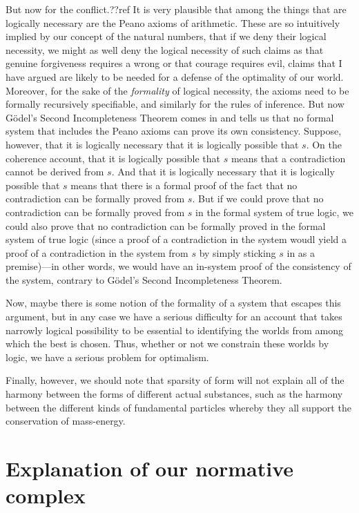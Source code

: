 But now for the conflict.??ref It is very plausible that among the things that are logically necessary are the Peano axioms of 
arithmetic. These are so intuitively implied by our concept of the natural numbers, that if we deny their logical necessity,
we might as well deny the logical necessity of such claims as that genuine forgiveness requires a wrong or that courage 
requires evil, claims that I have argued are likely to be needed for a defense of the optimality of our world. Moreover, for
the sake of the \textit{formality} of logical necessity, the axioms need to be formally recursively specifiable, and similarly
for the rules of inference. But now G\"odel's Second Incompleteness Theorem comes in and tells us that no formal system 
that includes the Peano axioms can prove its own consistency. Suppose, however, that it is logically necessary that it is 
logically possible that $s$. On the coherence account, that it is logically possible that $s$ means that a contradiction
cannot be derived from $s$. And that it is logically necessary that it is logically possible that $s$ means that there is 
a formal proof of the fact that no contradiction can be formally proved from $s$. But if we could prove that no 
contradiction can be formally proved from $s$ in the formal system of true logic, we could also prove that no 
contradiction can be formally proved in the formal system of true logic (since a proof of a contradiction in the system
woudl yield a proof of a contradiction in the system from $s$ by simply sticking $s$ in as a premise)---in other words,
we would have an in-system proof of the consistency of the system, contrary to G\"odel's Second Incompleteness Theorem.

Now, maybe there is some notion of the formality of a system that escapes this argument, but in any case we have a 
serious difficulty for an account that takes narrowly logical possibility to be essential to identifying the worlds 
from among which the best is chosen. Thus, whether or not we constrain these worlds by logic, we have a serious problem
for optimalism.

Finally, however, we should note that sparsity of form will not explain all of the harmony between the forms of different 
actual substances, such as the harmony between the different kinds of fundamental particles whereby they all support the conservation of mass-energy.

\section{Explanation of our normative complex}

